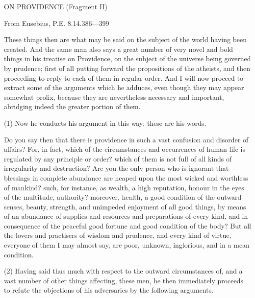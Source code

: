 
ON PROVIDENCE (Fragment II)

From Eusebius, P.E. 8.14.386—399

These things then are what may be said on the subject of the world having been created. And the
same man also says a great number of very novel and bold things in his treatise on Providence, on
the subject of the universe being governed by prudence; first of all putting forward the propositions
of the atheists, and then proceeding to reply to each of them in regular order. And I will now
proceed to extract some of the arguments which he adduces, even though they may appear
somewhat prolix, because they are nevertheless necessary and important, abridging indeed the
greater portion of them.

(1) Now he conducts his argument in this way; these are his words.

Do you say then that there is providence in such a vast confusion and disorder of affairs? For, in
fact, which of the circumstances and occurrences of human life is regulated by any principle or
order? which of them is not full of all kinds of irregularity and destruction? Are you the only person
who is ignorant that blessings in complete abundance are heaped upon the most wicked and
worthless of mankind? such, for instance, as wealth, a high reputation, honour in the eyes of the
multitude, authority? moreover, health, a good condition of the outward senses, beauty, strength,
and unimpeded enjoyment of all good things, by means of an abundance of supplies and resources
and preparations of every kind, and in consequence of the peaceful good fortune and good
condition of the body? But all the lovers and practisers of wisdom and prudence, and every kind of
virtue, everyone of them I may almost say, are poor, unknown, inglorious, and in a mean condition.

(2) Having said thus much with respect to the outward circumstances of, and a vast number of
other things affecting, these men, he then immediately proceeds to refute the objections of his
adversaries by the following arguments.

